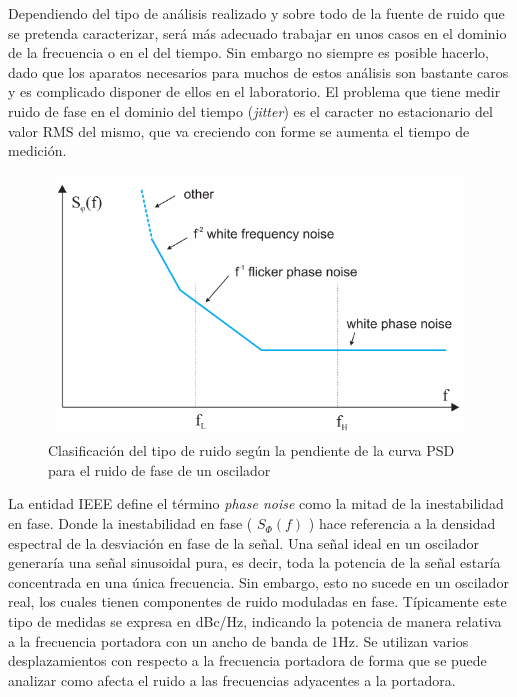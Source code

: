 Dependiendo del tipo de análisis realizado y sobre todo de 
la fuente de ruido que se pretenda caracterizar, será más adecuado trabajar en 
unos casos en el dominio de la frecuencia o en el del tiempo. Sin embargo no 
siempre es posible hacerlo, dado que los aparatos necesarios para muchos de 
estos análisis son bastante caros y es complicado disponer de ellos en el 
laboratorio.  El 
problema que tiene medir ruido de fase en el dominio del tiempo 
(\textit{jitter}) es el caracter no estacionario del valor RMS del mismo, que 
va creciendo con forme se aumenta el tiempo de medición.

\begin{figure}
	\centering
	\includegraphics[width=0.7\linewidth]{imagenes/psd_noise}
	\caption[Tipos de ruido en la curva PSD para un XO.]{Clasificación del tipo 
	de ruido según la pendiente de la curva PSD para el ruido de fase de un 
	oscilador}
	\label{fig:psdnoise}
\end{figure}

La entidad IEEE define el término \textit{phase noise} \cite{ieeephysdefs} como 
la mitad 
de la inestabilidad en fase. Donde la inestabilidad en fase ( $S_{\Phi} (f)$ ) 
hace referencia a la densidad espectral de la desviación en fase de la señal. 
Una señal ideal en un oscilador generaría una señal sinusoidal pura, es decir, 
toda la potencia de la señal estaría concentrada en una única frecuencia. Sin 
embargo, esto no sucede en un oscilador real, los cuales tienen componentes de 
ruido moduladas en fase. Típicamente este tipo de medidas se expresa en dBc/Hz, 
indicando la potencia de manera relativa a la frecuencia portadora con un ancho 
de banda de 1Hz. Se utilizan varios desplazamientos con respecto a la 
frecuencia portadora de forma que se puede analizar como afecta el ruido a las 
frecuencias adyacentes a la portadora.

